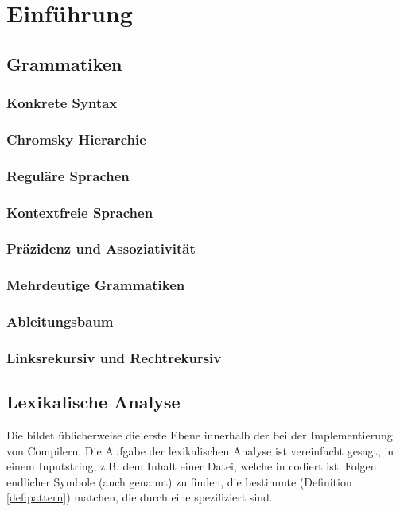 \chapter{Einführung}
\section{Grammatiken}
\subsection{Konkrete Syntax}
\subsection{Chromsky Hierarchie}
\subsection{Reguläre Sprachen}
\subsection{Kontextfreie Sprachen}
\subsection{Präzidenz und Assoziativität}
\subsection{Mehrdeutige Grammatiken}
\subsection{Ableitungsbaum}
\subsection{Linksrekursiv und Rechtrekursiv}
\section{Lexikalische Analyse}
Die  bildet üblicherweise die erste Ebene innerhalb der  bei der Implementierung von Compilern. Die Aufgabe der lexikalischen Analyse ist vereinfacht gesagt, in einem Inputstring, z.B. dem Inhalt einer Datei, welche in  codiert ist, Folgen endlicher Symbole (auch  genannt) zu finden, die bestimmte  (Definition \ref{def:pattern}) matchen, die durch eine  spezifiziert sind.


